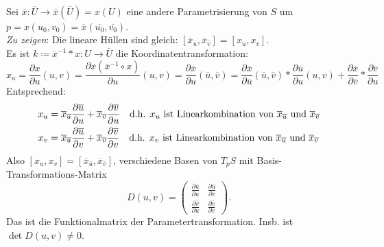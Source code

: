 \begin{remark}
  \ \\
  Sei $ \overline{x} : \overline{U} \to \overline{x}(\overline{U}) = x(U) $ eine andere Parametrisierung von $ S $ um $ p = x(u_0, v_0) = \overline{x}(\overline{u_0}, \overline{v_0}) $. \\
  \emph{Zu zeigen}: Die lineare Hüllen sind gleich: $ [\overline{x}_{\overline{u}}, \overline{x}_{\overline{v}}] = [x_u, x_v] $. \\
  Es ist $ k \coloneqq \overline{x}^{-1}*x : U \to \overline{U} $ die Koordinatentransformation:
  \begin{equation*}
    x_u = \frac{\partial x}{\partial u}(u,v) = \frac{\partial \overline{x}(\overline{x}^{-1} \circ x)}{\partial u}(u,v) = \frac{\partial \overline{x}}{\partial u}(\overline{u}, \overline{v}) = \frac{\partial \overline{x}}{\partial \overline{u}}(\overline{u},\overline{v}) *\frac{\partial \overline{u}}{\partial u}(u,v)+\frac{\partial \overline{x}}{\partial \overline{v}} * \frac{\partial \overline{v}}{\partial u}
  \end{equation*}
  Entsprechend:
  \begin{align*}
    x_u &= \overline{x}_{\overline{u}}\frac{\partial \overline{u}}{\partial u} + \overline{x}_{\overline{v}}\frac{\partial \overline{v}}{\partial u} \quad \text{d.h. $ x_u $ ist Linearkombination von $ \overline{x}_{\overline{u}} $ und $ \overline{x}_{\overline{v}} $} \\
    x_v &= \overline{x}_{\overline{u}}\frac{\partial \overline{u}}{\partial v} + \overline{x}_{\overline{v}}\frac{\partial \overline{v}}{\partial v} \quad \text{d.h. $ x_v $ ist Linearkombination von $ \overline{x}_{\overline{u}} $ und $ \overline{x}_{\overline{v}} $}
  \end{align*}
  Also $ [x_u, x_v] = [\overline{x}_{\overline{u}}, \overline{x}_{\overline{v}}] $, verschiedene Basen von $ T_pS $ mit Basis-Transformations-Matrix
  \begin{equation*}
    D(u,v) = \begin{pmatrix}
      \frac{\partial \overline{u}}{\partial u} & \frac{\partial \overline{u}}{\partial v} \\
      \frac{\partial \overline{v}}{\partial u} & \frac{\partial \overline{v}}{\partial v}
    \end{pmatrix}\text{.}
  \end{equation*}
  Das ist die Funktionalmatrix der Parametertransformation. Insb. ist $ \det D(u,v) \neq 0 $.
\end{remark}

